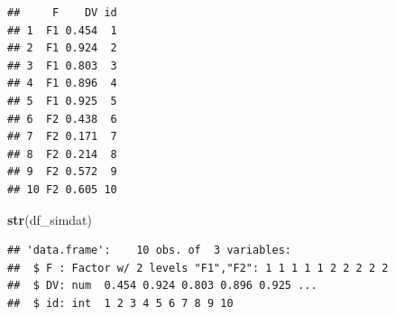 \documentclass[12pt,]{krantz}
\newenvironment{Shaded}{\begin{snugshade}}{\end{snugshade}}
\newcommand{\KeywordTok}[1]{\textcolor[rgb]{0.13,0.29,0.53}{\textbf{#1}}}
\newcommand{\DataTypeTok}[1]{\textcolor[rgb]{0.13,0.29,0.53}{#1}}
\newcommand{\DecValTok}[1]{\textcolor[rgb]{0.00,0.00,0.81}{#1}}
\newcommand{\FloatTok}[1]{\textcolor[rgb]{0.00,0.00,0.81}{#1}}
\newcommand{\StringTok}[1]{\textcolor[rgb]{0.31,0.60,0.02}{#1}}
\newcommand{\CommentTok}[1]{\textcolor[rgb]{0.56,0.35,0.01}{\textit{#1}}}
\newcommand{\OtherTok}[1]{\textcolor[rgb]{0.56,0.35,0.01}{#1}}
\newcommand{\OperatorTok}[1]{\textcolor[rgb]{0.81,0.36,0.00}{\textbf{#1}}}
\newcommand{\NormalTok}[1]{#1}
\theoremstyle{definition}
\theoremstyle{definition}
\theoremstyle{definition}
\theoremstyle{remark}
\begin{document}
\begin{Shaded}
\end{Shaded}

\begin{verbatim}
##     F    DV id
## 1  F1 0.454  1
## 2  F1 0.924  2
## 3  F1 0.803  3
## 4  F1 0.896  4
## 5  F1 0.925  5
## 6  F2 0.438  6
## 7  F2 0.171  7
## 8  F2 0.214  8
## 9  F2 0.572  9
## 10 F2 0.605 10
\end{verbatim}

\begin{Shaded}
\begin{Highlighting}[]
\KeywordTok{str}\NormalTok{(df_simdat)}
\end{Highlighting}
\end{Shaded}

\begin{verbatim}
## 'data.frame':    10 obs. of  3 variables:
##  $ F : Factor w/ 2 levels "F1","F2": 1 1 1 1 1 2 2 2 2 2
##  $ DV: num  0.454 0.924 0.803 0.896 0.925 ...
##  $ id: int  1 2 3 4 5 6 7 8 9 10
\end{verbatim}

\begin{Shaded}
\end{Shaded}
\end{document}

